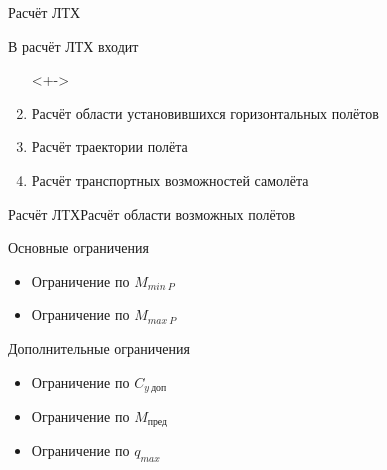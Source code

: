 \begin{frame}{Расчёт ЛТХ}
\begin{block}{В расчёт ЛТХ входит}
   \begin{enumerate}
    \item [] <+->
    \item <+-> Расчёт области установившихся горизонтальных полётов  
    \item <+-> Расчёт траектории полёта 
    \item <+-> Расчёт транспортных возможностей самолёта
   \end{enumerate}
\end{block}
\end{frame}

\begin{frame}{Расчёт ЛТХ}{Расчёт области возможных полётов}

    \begin{block}{Основные ограничения}
        \begin{itemize}
            \item Ограничение по $M_{min \ P}$ 
            \item Ограничение по $M_{max \ P}$
        \end{itemize}
    \end{block}

    \begin{block}{Дополнительные ограничения}
        \begin{itemize}
            \item Ограничение по $C_{y \ \text{доп}}$
            \item Ограничение по $M_\text{пред}$
            \item Ограничение по $q_{max}$
        \end{itemize}
    \end{block}

\end{frame}


